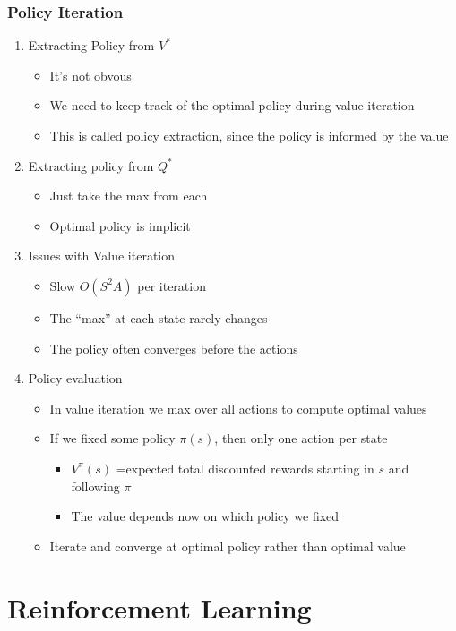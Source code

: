 \documentclass[11pt]{article}
\begin{document}
\subsubsection{Policy Iteration}
\label{sec:orgc437606}
\begin{enumerate}
\item Extracting Policy from \(V^*\)
\label{sec:org541d9d9}
\begin{itemize}
\item It's not obvous
\item We need to keep track of the optimal policy during value iteration
\item This is called policy extraction, since the policy is informed by the value
\end{itemize}
\item Extracting policy from \(Q^*\)
\label{sec:org04c0ce4}
\begin{itemize}
\item Just take the max from each
\item Optimal policy is implicit
\end{itemize}
\item Issues with Value iteration
\label{sec:org5293c44}
\begin{itemize}
\item Slow \(O(S^2A)\) per iteration
\item The ``max'' at each state rarely changes
\item The policy often converges before the actions
\end{itemize}
\item Policy evaluation
\label{sec:org6633f71}
\begin{itemize}
\item In value iteration we max over all actions to compute optimal values
\item If we fixed some policy \(\pi(s)\), then only one action per state
\begin{itemize}
\item \(V^\pi(s)\) =expected total discounted rewards starting in \(s\) and following \(\pi\)
\item The value depends now on which policy we fixed
\end{itemize}
\item Iterate and converge at optimal policy rather than optimal value
\end{itemize}
\end{enumerate}
\section{Reinforcement Learning}
\label{sec:org5503562}
\end{document}

